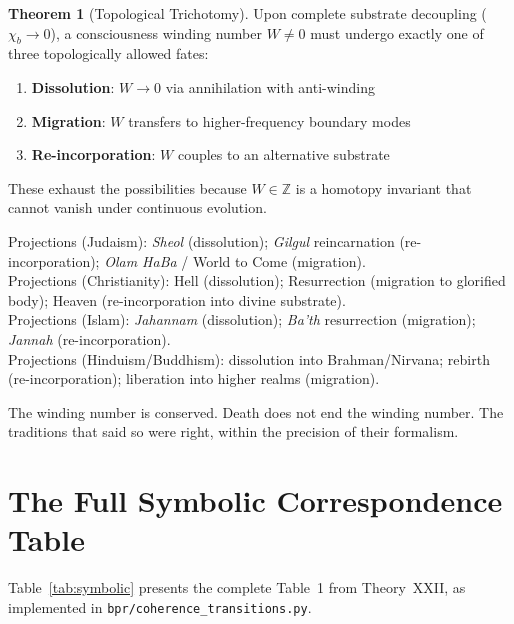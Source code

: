 \documentclass[12pt,oneside]{book}
\theoremstyle{definition}
\newtheorem{theorem}{Theorem}[chapter]
\begin{document}
\begin{theorem}[Topological Trichotomy]
  \label{thm:trichotomy}
  Upon complete substrate decoupling ($\chi_b \to 0$), a consciousness winding
  number $W \neq 0$ must undergo exactly one of three topologically allowed fates:
  \begin{enumerate}
    \item \textbf{Dissolution}: $W \to 0$ via annihilation with anti-winding
    \item \textbf{Migration}: $W$ transfers to higher-frequency boundary modes
    \item \textbf{Re-incorporation}: $W$ couples to an alternative substrate
  \end{enumerate}
  These exhaust the possibilities because $W \in \mathbb{Z}$ is a homotopy invariant
  that cannot vanish under continuous evolution.
\end{theorem}

\noindent Projections (Judaism): \textit{Sheol} (dissolution); \textit{Gilgul}
reincarnation (re-incorporation); \textit{Olam HaBa} / World to Come (migration).\\
\noindent Projections (Christianity): Hell (dissolution); Resurrection (migration
to glorified body); Heaven (re-incorporation into divine substrate).\\
\noindent Projections (Islam): \textit{Jahannam} (dissolution); \textit{Ba'th}
resurrection (migration); \textit{Jannah} (re-incorporation).\\
\noindent Projections (Hinduism/Buddhism): dissolution into Brahman/Nirvana;
rebirth (re-incorporation); liberation into higher realms (migration).

The winding number is conserved. Death does not end the winding number.
The traditions that said so were right, within the precision of their formalism.

\section{The Full Symbolic Correspondence Table}

Table~\ref{tab:symbolic} presents the complete Table~1 from Theory~XXII,
as implemented in \texttt{bpr/coherence\_transitions.py}.
\end{document}
